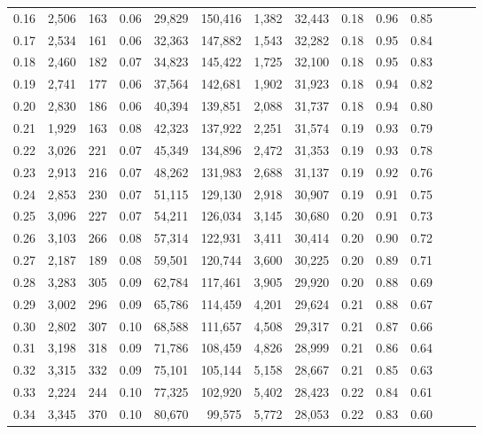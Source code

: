 \begin{tabular}{rrrrrrrrrrrrrr}
0.16 &  2,506 &    163 &  0.06 &   29,829 &  150,416 &   1,382 &  32,443 &  0.18 &  0.96 &      0.85 \\
0.17 &  2,534 &    161 &  0.06 &   32,363 &  147,882 &   1,543 &  32,282 &  0.18 &  0.95 &      0.84 \\
0.18 &  2,460 &    182 &  0.07 &   34,823 &  145,422 &   1,725 &  32,100 &  0.18 &  0.95 &      0.83 \\
0.19 &  2,741 &    177 &  0.06 &   37,564 &  142,681 &   1,902 &  31,923 &  0.18 &  0.94 &      0.82 \\
0.20 &  2,830 &    186 &  0.06 &   40,394 &  139,851 &   2,088 &  31,737 &  0.18 &  0.94 &      0.80 \\
0.21 &  1,929 &    163 &  0.08 &   42,323 &  137,922 &   2,251 &  31,574 &  0.19 &  0.93 &      0.79 \\
0.22 &  3,026 &    221 &  0.07 &   45,349 &  134,896 &   2,472 &  31,353 &  0.19 &  0.93 &      0.78 \\
0.23 &  2,913 &    216 &  0.07 &   48,262 &  131,983 &   2,688 &  31,137 &  0.19 &  0.92 &      0.76 \\
0.24 &  2,853 &    230 &  0.07 &   51,115 &  129,130 &   2,918 &  30,907 &  0.19 &  0.91 &      0.75 \\
0.25 &  3,096 &    227 &  0.07 &   54,211 &  126,034 &   3,145 &  30,680 &  0.20 &  0.91 &      0.73 \\
0.26 &  3,103 &    266 &  0.08 &   57,314 &  122,931 &   3,411 &  30,414 &  0.20 &  0.90 &      0.72 \\
0.27 &  2,187 &    189 &  0.08 &   59,501 &  120,744 &   3,600 &  30,225 &  0.20 &  0.89 &      0.71 \\
0.28 &  3,283 &    305 &  0.09 &   62,784 &  117,461 &   3,905 &  29,920 &  0.20 &  0.88 &      0.69 \\
0.29 &  3,002 &    296 &  0.09 &   65,786 &  114,459 &   4,201 &  29,624 &  0.21 &  0.88 &      0.67 \\
0.30 &  2,802 &    307 &  0.10 &   68,588 &  111,657 &   4,508 &  29,317 &  0.21 &  0.87 &      0.66 \\
0.31 &  3,198 &    318 &  0.09 &   71,786 &  108,459 &   4,826 &  28,999 &  0.21 &  0.86 &      0.64 \\
0.32 &  3,315 &    332 &  0.09 &   75,101 &  105,144 &   5,158 &  28,667 &  0.21 &  0.85 &      0.63 \\
0.33 &  2,224 &    244 &  0.10 &   77,325 &  102,920 &   5,402 &  28,423 &  0.22 &  0.84 &      0.61 \\
0.34 &  3,345 &    370 &  0.10 &   80,670 &   99,575 &   5,772 &  28,053 &  0.22 &  0.83 &      0.60 \\

\end{tabular}
